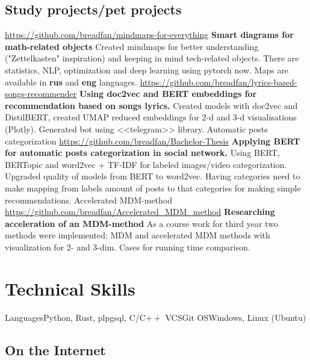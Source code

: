 \documentclass[11pt,a4paper]{moderncv}
\begin{document}
  \subsection{Study projects/pet projects}
  {\url{https://github.com/breadfan/mindmaps-for-everything}\newline{}
  	\textbf{Smart diagrams for math-related objects}\newline{}
  	Created mindmaps for better understanding ("Zettelkasten" inspiration) and keeping in mind tech-related objects. There are statistics, NLP, optimization and deep learning using pytorch now. Maps are available in \textbf{rus} and \textbf{eng} languages.	  
  }
  {\url{https://github.com/breadfan/lyrics-based-songs-recommender}\newline{}
  	\textbf{Using doc2vec and BERT embeddings for recommendation based on songs lyrics.}\newline{}
  	Created models with doc2vec and DistilBERT, created UMAP reduced embeddings for 2-d and 3-d visualisations (Plotly). Generated bot using <<telegram>> library.	  
  }
	\cvline
	{Automatic posts categorization}
	{\url{https://github.com/breadfan/Bachelor-Thesis}\newline{}
		\textbf{Applying BERT for automatic posts categorization in social network.} \newline{}
		Using BERT, BERTopic and word2vec + TF-IDF for labeled images/video categorization. \newline{}
		Upgraded quality of models from BERT to word2vec.\newline{}
		Having categories need to make mapping from labels amount of posts to that categories for making simple recommendations.
  }
  \cvline
  {Accelerated MDM-method}
  {\url{https://github.com/breadfan/Accelerated_MDM_method}\newline{}
  	\textbf{Researching acceleration of an MDM-method}\newline{}
  	As a course work for third year two methods were implemented: MDM and accelerated MDM methods with visualization for 2- and 3-dim. Cases for running time comparison.}

  	
  


\section{Technical Skills}
\cvline
  {Languages}{Python, Rust, plpgsql, C/C$++$}
\cvline
  {VCS}{Git}
\cvline
  {OS}{Windows, Linux (Ubuntu)}




  \subsection{On the Internet}
    
\end{document}

